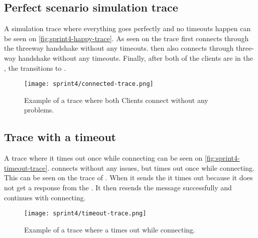 \subsection{Perfect scenario simulation trace}
A simulation trace where everything goes perfectly and no timeouts happen can be seen on \autoref{fig:sprint4-happy-trace}.
As seen on the trace  first connects through the threeway handshake without any timeouts.
 then also connects through three-way handshake without any timeouts.
Finally, after both of the clients are in the , the  transitions to .
\begin{figure}[h]
    \centering
    \texttt{[image: sprint4/connected-trace.png]}
    \caption{Example of a trace where both Clients connect without any problems.}
    \label{fig:sprint4-happy-trace}
\end{figure}

\subsection{Trace with a timeout}
A trace where it times out once while connecting can be seen on \autoref{fig:sprint4-timeout-trace}.
 connects without any issues, but  times out once while connecting.
This can be seen on the trace of . When it sends the  it times out because it does not get a response from the .
It then resends the message successfully and continues with connecting.
\begin{figure}[h]
    \centering
    \texttt{[image: sprint4/timeout-trace.png]}
    \caption{Example of a trace where a  times out while connecting.}
    \label{fig:sprint4-timeout-trace}
\end{figure}
